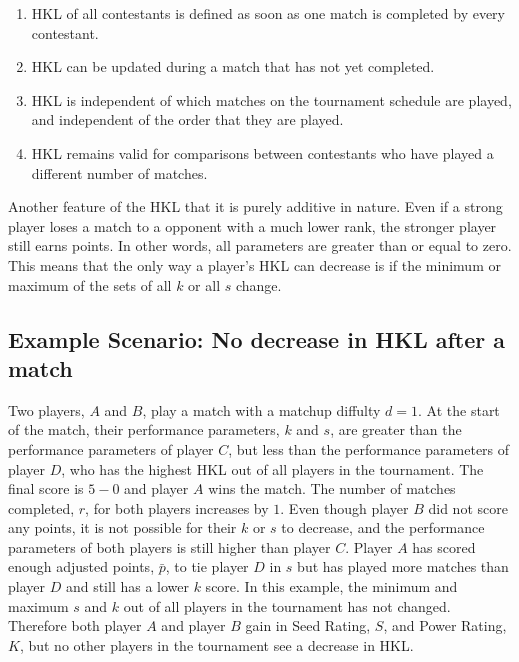\documentclass[letterpaper, 10 pt, conference]{ieeeconf}  %
\begin{document}
\begin{enumerate}
        \item HKL of all contestants is defined as soon as one match is
        completed by every contestant.
        \item HKL can be updated during a match that has not yet completed.
        \item HKL is independent of which matches on the tournament schedule are
        played, and independent of the order that they are played.
        \item HKL remains valid for comparisons between contestants who have
        played a different number of matches.
\end{enumerate}

Another feature of the HKL that it is purely additive in nature. Even if a
strong player loses a match to a opponent with a much lower rank, the stronger
player still earns points. In other words, all parameters are greater than or
equal to zero. This means that the only way a player's HKL can decrease is if
the minimum or maximum of the sets of all $k$ or all $s$ change. 

\subsection{Example Scenario: No decrease in HKL after a match}
Two players, $A$ and $B$, play a match with a matchup diffulty $d=1$. At the
start of the match, their performance parameters, $k$ and $s$, are greater than
the performance parameters of player $C$, but less than the performance
parameters of player $D$, who has the highest HKL out of all players in the
tournament. The final score is $5-0$ and player $A$ wins the match. The number
of matches completed, $r$, for both players increases by $1$. Even though player
$B$ did not score any points, it is not possible for their $k$ or $s$ to
decrease, and the performance parameters of both players is still higher than
player $C$. Player $A$ has scored enough adjusted points, $\bar{p}$, to tie
player $D$ in $s$ but has played more matches than player $D$ and still has a
lower $k$ score. In this example, the minimum and maximum $s$ and $k$ out of all
players in the tournament has not changed. Therefore both player $A$ and player
$B$ gain in Seed Rating, $S$, and Power Rating, $K$, but no other players in the
tournament see a decrease in HKL.
\end{document}
